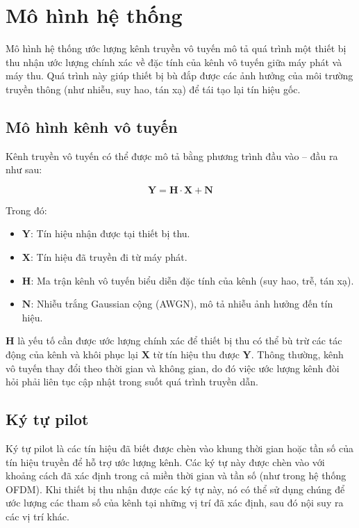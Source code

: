 \section{Mô hình hệ thống}

Mô hình hệ thống ước lượng kênh truyền vô tuyến mô tả quá trình một thiết bị thu nhận ước lượng chính xác về đặc tính của kênh vô tuyến giữa máy phát và máy thu. Quá trình này giúp thiết bị bù đắp được các ảnh hưởng của môi trường truyền thông (như nhiễu, suy hao, tán xạ) để tái tạo lại tín hiệu gốc. 

\subsection{Mô hình kênh vô tuyến}

Kênh truyền vô tuyến có thể được mô tả bằng phương trình đầu vào – đầu ra như sau:

\begin{equation}
    \bm{Y} = \bm{H} \cdot \bm{X} + \bm{N}
\end{equation}

Trong đó:
\begin{itemize}
    \item $\bm{Y}$: Tín hiệu nhận được tại thiết bị thu.
    \item $\bm{X}$: Tín hiệu đã truyền đi từ máy phát.
    \item $\bm{H}$: Ma trận kênh vô tuyến biểu diễn đặc tính của kênh (suy hao, trễ, tán xạ).
    \item $\bm{N}$: Nhiễu trắng Gaussian cộng (AWGN), mô tả nhiễu ảnh hưởng đến tín hiệu.
\end{itemize}

$\bm{H}$ là yếu tố cần được ước lượng chính xác để thiết bị thu có thể bù trừ các tác động của kênh và khôi phục lại $\bm{X}$ từ tín hiệu thu được $\bm{Y}$. 
Thông thường, kênh vô tuyến thay đổi theo thời gian và không gian, do đó việc ước lượng kênh đòi hỏi phải liên tục cập nhật trong suốt quá trình truyền dẫn.

\subsection{Ký tự pilot}

Ký tự pilot là các tín hiệu đã biết được chèn vào khung thời gian hoặc tần số của tín hiệu truyền để hỗ trợ ước lượng kênh. 
Các ký tự này được chèn vào với khoảng cách đã xác định trong cả miền thời gian và tần số (như trong hệ thống OFDM). 
Khi thiết bị thu nhận được các ký tự này, nó có thể sử dụng chúng để ước lượng các tham số của kênh tại những vị trí đã xác định, sau đó nội suy ra các vị trí khác.

